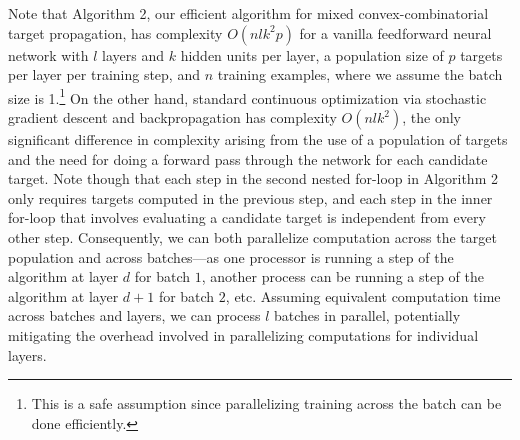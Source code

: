 \documentclass[12pt,letterpaper]{article}
\begin{document}
Note that Algorithm 2, our efficient algorithm for mixed convex-combinatorial target propagation, has complexity $O(nlk^{2}p)$ for a vanilla feedforward neural network with $l$ layers and $k$ hidden units per layer, a population size of $p$ targets per layer per training step, and $n$ training examples, where we assume the batch size is 1.\footnote{This is a safe assumption since parallelizing training across the batch can be done efficiently.} On the other hand, standard continuous optimization via stochastic gradient descent and backpropagation has complexity $O(nlk^{2})$, the only significant difference in complexity arising from the use of a population of targets and the need for doing a forward pass through the network for each candidate target. Note though that each step in the second nested for-loop in Algorithm 2 only requires targets computed in the previous step, and each step in the inner for-loop that involves evaluating a candidate target is independent from every other step. Consequently, we can both parallelize computation across the target population and across batches---as one processor is running a step of the algorithm 
at layer $d$ for batch $1$, another process can be running a step of the algorithm at layer $d+1$ for batch $2$, etc. Assuming equivalent computation time across batches and layers, we can process $l$ batches in parallel, potentially mitigating the overhead involved in parallelizing computations for individual layers. 
\end{document}
